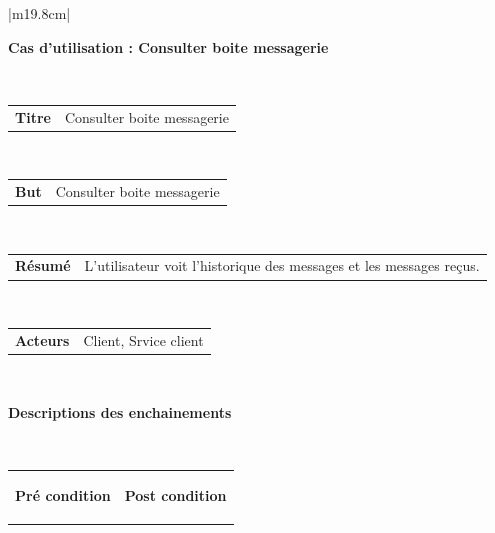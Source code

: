 \begin{table}[h]
	\hspace*{-2cm}
	\vspace*{-2cm}
	\begin{tabular}{|m{19.8cm}|}
		\hline
		\begin{center}
			\textbf{Cas d’utilisation : Consulter boite messagerie}
		\end{center}
		\\
		[-4ex] 
		\hline
		\begin{tabular}{m{3cm}|m{14cm}}
			
			\centering 	\textbf{Titre} & Consulter boite messagerie
			\\
			[0ex] 
		\end{tabular}
		\\
		
		\hline
		\begin{tabular}{m{3cm}|m{14cm}}
			
			\centering 	\textbf{But} & Consulter boite messagerie\\
			[0ex] 
			
		\end{tabular}
		\\
		\hline
		\begin{tabular}{m{3cm}|m{15.5cm}}
			
			\centering 	\textbf{Résumé} &L'utilisateur voit l'historique des  messages et les messages reçus.
			\\
			[0ex] 
		\end{tabular}
		\\
		
		\hline
		\begin{tabular}{m{3cm}|m{14cm}}
			
			\centering 	\textbf{Acteurs } & Client, Srvice client \\[0ex]
			
		\end{tabular}
		\\
		
		\hline
		\begin{center}
			\textbf{Descriptions des enchainements}
		\end{center}
		\\
		[-4ex] 
		\hline	
		\begin{tabular}{m{9.3cm}|m{9.3cm}}
			
			\begin{center}
				\textbf{Pré condition}
			\end{center}
			& 
			\begin{center}
				\textbf{Post condition}
			\end{center}
			\\[-4ex]
		\end{tabular}
		\\
		

\end{tabular}
\end{table}
